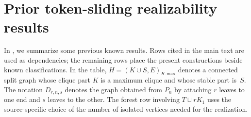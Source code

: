 \documentclass[a4paper]{article}
\theoremstyle{plain}
\theoremstyle{definition}
\numberwithin{equation}{section}
\begin{document}
\section{Prior token-sliding realizability results}
\label{app:known-realizability}

In , we summarize some previous known results.
Rows cited in the main text are used as dependencies; the remaining rows place the present constructions beside known classifications.
In the table, $H=(K\cup S,E)_{\text{$K$-max}}$ denotes a connected split graph whose clique part $K$ is a maximum clique and whose stable part is~$S$.
The notation $D_{r,n,s}$ denotes the graph obtained from $P_n$ by attaching $r$ leaves to one end and $s$ leaves to the other.
The forest row involving $T\sqcup rK_1$ uses the source-specific choice of the number of isolated vertices needed for the realization.
\end{document}
